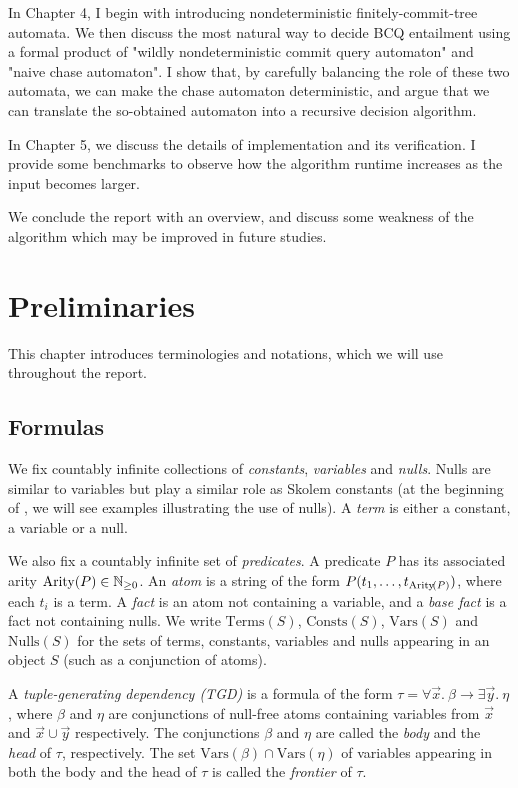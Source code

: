 \documentclass[12pt]{report}
\theoremstyle{plain}
\theoremstyle{definition}
\def\Vars{{\mathrm{Vars}}}
\def\Consts{{\mathrm{Consts}}}
\def\Terms{{\mathrm{Terms}}}
\def\Nulls{{\mathrm{Nulls}}}
\newcommand{\Arity}[1]{\ensuremath{\normalfont{\operatorname{Arity}}\!\left( #1 \right)}}
\begin{document}
In Chapter 4, I begin with introducing nondeterministic finitely-commit-tree automata. We then discuss the most natural way to decide BCQ entailment using a formal product of "wildly nondeterministic commit query automaton" and "naive chase automaton". I show that, by carefully balancing the role of these two automata, we can make the chase automaton deterministic, and argue that we can translate the so-obtained automaton into a recursive decision algorithm.

In Chapter 5, we discuss the details of implementation and its verification. I provide some benchmarks to observe how the algorithm runtime increases as the input becomes larger.

We conclude the report with an overview, and discuss some weakness of the algorithm which may be improved in future studies.

\newpage
\chapter{Preliminaries}

This chapter introduces terminologies and notations, which we will use throughout the report.

\section{Formulas}

We fix countably infinite collections of \emph{constants}, \emph{variables} and \emph{nulls}. Nulls are similar to variables but play a similar role as Skolem constants (at the beginning of , we will see examples illustrating the use of nulls). A \emph{term} is either a constant, a variable or a null.

We also fix a countably infinite set of \emph{predicates}. A predicate $P$ has its associated arity $\Arity{P} \in \mathbb{N}_{\geq 0}$. An \emph{atom} is a string of the form $P(t_1, \ldots, t_{\Arity{P}})$, where each $t_i$ is a term. A \emph{fact} is an atom not containing a variable, and a \emph{base fact} is a fact not containing nulls. We write $\Terms(S)$, $\Consts(S)$, $\Vars(S)$ and $\Nulls(S)$ for the sets of terms, constants, variables and nulls appearing in an object $S$ (such as a conjunction of atoms).

A \emph{tuple-generating dependency (TGD)} is a formula of the form $\tau = \forall \vec{x}.\ \beta \rightarrow \exists \vec{y}.\ \eta$, where $\beta$ and $\eta$ are conjunctions of null-free atoms containing variables from $\vec{x}$ and $\vec{x} \cup \vec{y}$ respectively. The conjunctions $\beta$ and $\eta$ are called the \emph{body} and the \emph{head} of $\tau$, respectively. The set $\Vars(\beta) \cap \Vars(\eta)$ of variables appearing in both the body and the head of $\tau$ is called the \emph{frontier} of $\tau$.
\end{document}
